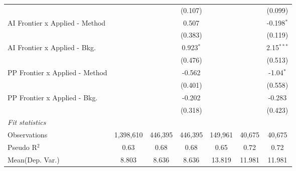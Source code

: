 \begin{tabular}{lcccccc}
                                  &                &               & (0.107)        &                &               & (0.099)\\   
   AI Frontier x Applied - Method &                &               & 0.507          &                &               & -0.198$^{*}$\\   
                                  &                &               & (0.383)        &                &               & (0.119)\\   
   AI Frontier x Applied - Bkg.   &                &               & 0.923$^{*}$    &                &               & 2.15$^{***}$\\   
                                  &                &               & (0.476)        &                &               & (0.513)\\   
   PP Frontier x Applied - Method &                &               & -0.562         &                &               & -1.04$^{*}$\\   
                                  &                &               & (0.401)        &                &               & (0.558)\\   
   PP Frontier x Applied - Bkg.   &                &               & -0.202         &                &               & -0.283\\   
                                  &                &               & (0.318)        &                &               & (0.423)\\   
   \midrule
   \emph{Fit statistics}\\
   Observations                   & 1,398,610      & 446,395       & 446,395        & 149,961        & 40,675        & 40,675\\  
   Pseudo R$^2$                   & 0.63           & 0.68          & 0.68           & 0.65           & 0.72          & 0.72\\  
Mean(Dep. Var.) & 8.803 & 8.636 & 8.636 & 13.819 & 11.981 & 11.981 \\
   

\end{tabular}
